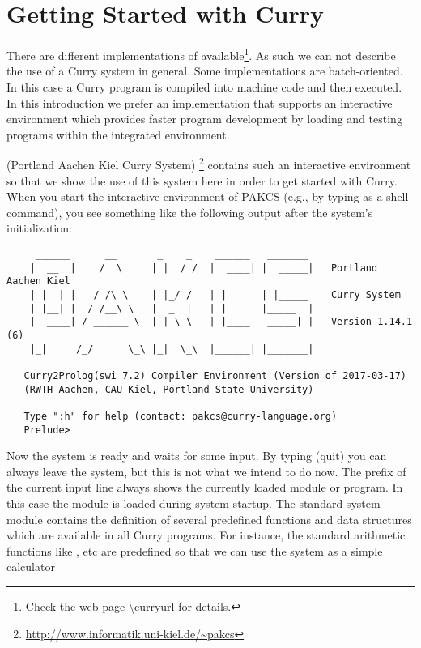 \chapter{Getting Started with Curry}

There are different implementations of \curry{}
available\footnote{Check the web page \url{\curryurl} for details.}.
As such we can not describe the use of a Curry system
in general. Some implementations are batch-oriented.  In this case a 
Curry program is compiled into machine code and then executed. 
In this introduction we prefer an implementation that supports an interactive environment which provides faster program development by loading and testing programs within the integrated environment.

\pakcs{} (Portland Aachen Kiel Curry System)
\cite{Hanus16PAKCS}\footnote{\url{http://www.informatik.uni-kiel.de/~pakcs}}
contains such an interactive environment so that we show the use
of this system here in order to get started with Curry.
When you start the interactive environment of PAKCS
(e.g., by typing 
as a shell command),
you see something like the following output after the system's
initialization:
\begin{verbatim}
     ______      __       _    _    ______   _______     
    |  __  |    /  \     | |  / /  |  ____| |  _____|   Portland Aachen Kiel
    | |  | |   / /\ \    | |_/ /   | |      | |_____    Curry System
    | |__| |  / /__\ \   |  _  |   | |      |_____  |   
    |  ____| / ______ \  | | \ \   | |____   _____| |   Version 1.14.1 (6)
    |_|     /_/      \_\ |_|  \_\  |______| |_______|   
   
   Curry2Prolog(swi 7.2) Compiler Environment (Version of 2017-03-17)
   (RWTH Aachen, CAU Kiel, Portland State University)
   
   Type ":h" for help (contact: pakcs@curry-language.org)
   Prelude> 
\end{verbatim}
Now the system is ready and waits for some input.
By typing  (quit) you can always leave the system,
but this is not what we intend to do now.
The prefix of the current input line always shows the currently
loaded module or program. In this case the module
is loaded during system startup.
The standard system module  contains
the definition of several predefined functions and data structures
which are available in all Curry programs.
For instance, the standard arithmetic functions like \code{+}, \code{*} etc
are predefined so that we can use the system as a simple calculator
